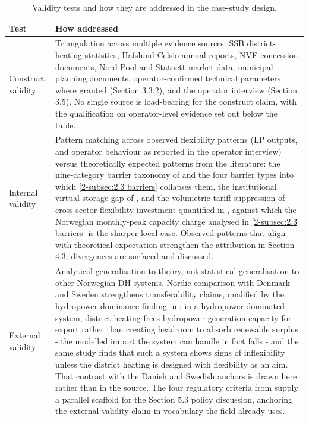 \begin{table}[h]
\centering
\caption{Validity tests and how they are addressed in the case-study design.}
\small
\begin{tabular}{p{3.5cm} p{10cm}}
\toprule
\textbf{Test} & \textbf{How addressed} \\
\midrule
Construct validity &
Triangulation across multiple evidence sources: SSB district-heating statistics, Hafslund Celsio annual reports, NVE concession documents, Nord Pool and Statnett market data, municipal planning documents, operator-confirmed technical parameters where granted (Section 3.3.2), and the operator interview (Section 3.5). No single source is load-bearing for the construct claim, with the qualification on operator-level evidence set out below the table. \\
\addlinespace
Internal validity &
Pattern matching across observed flexibility patterns (LP outputs, and operator behaviour as reported in the operator interview) versus theoretically expected patterns from the literature: the nine-category barrier taxonomy of \cite{sneum_barriers_2021} and the four barrier types into which \autoref{2-subsec:2.3 barriers} collapses them, the institutional virtual-storage gap of \cite{mitridati_heat_2020}, and the volumetric-tariff suppression of cross-sector flexibility investment quantified in \cite{bergaentzle_cross-sector_2022}, against which the Norwegian monthly-peak capacity charge analysed in \autoref{2-subsec:2.3 barriers} is the sharper local case. Observed patterns that align with theoretical expectation strengthen the attribution in Section 4.3; divergences are surfaced and discussed. \\
\addlinespace
External validity &
Analytical generalisation to theory, not statistical generalisation to other Norwegian DH systems. Nordic comparison with Denmark and Sweden strengthens transferability claims, qualified by the hydropower-dominance finding in \cite{askeland_balancing_2019}: in a hydropower-dominated system, district heating frees hydropower generation capacity for export rather than creating headroom to absorb renewable surplus - the modelled import the system can handle in fact falls - and the same study finds that such a system shows signs of inflexibility unless the district heating is designed with flexibility as an aim. That contrast with the Danish and Swedish anchors is drawn here rather than in the source. The four regulatory criteria from \cite{bergaentzle_electricity_2019} supply a parallel scaffold for the Section 5.3 policy discussion, anchoring the external-validity claim in vocabulary the field already uses. \\

\end{tabular}
\end{table}
